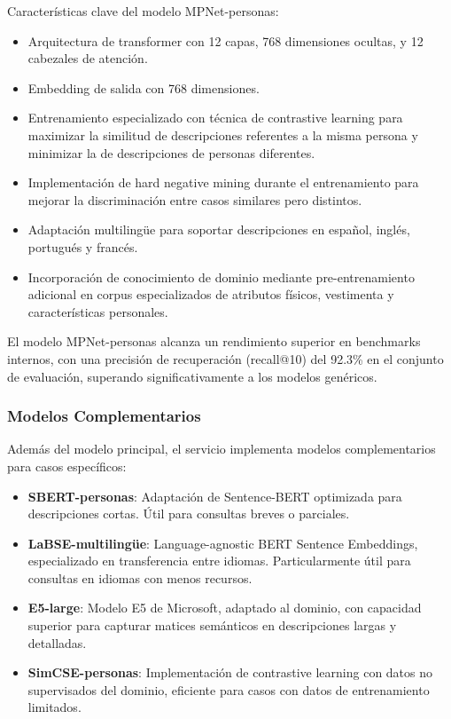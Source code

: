 \documentclass[12pt,a4paper]{article}
\begin{document}
Características clave del modelo MPNet-personas:
\begin{itemize}
    \item Arquitectura de transformer con 12 capas, 768 dimensiones ocultas, y 12 cabezales de atención.
    \item Embedding de salida con 768 dimensiones.
    \item Entrenamiento especializado con técnica de contrastive learning para maximizar la similitud de descripciones referentes a la misma persona y minimizar la de descripciones de personas diferentes.
    \item Implementación de hard negative mining durante el entrenamiento para mejorar la discriminación entre casos similares pero distintos.
    \item Adaptación multilingüe para soportar descripciones en español, inglés, portugués y francés.
    \item Incorporación de conocimiento de dominio mediante pre-entrenamiento adicional en corpus especializados de atributos físicos, vestimenta y características personales.
\end{itemize}

El modelo MPNet-personas alcanza un rendimiento superior en benchmarks internos, con una precisión de recuperación (recall@10) del 92.3\% en el conjunto de evaluación, superando significativamente a los modelos genéricos.

\subsubsection{Modelos Complementarios}
Además del modelo principal, el servicio implementa modelos complementarios para casos específicos:

\begin{itemize}
    \item \textbf{SBERT-personas}: Adaptación de Sentence-BERT optimizada para descripciones cortas. Útil para consultas breves o parciales.
    
    \item \textbf{LaBSE-multilingüe}: Language-agnostic BERT Sentence Embeddings, especializado en transferencia entre idiomas. Particularmente útil para consultas en idiomas con menos recursos.
    
    \item \textbf{E5-large}: Modelo E5 de Microsoft, adaptado al dominio, con capacidad superior para capturar matices semánticos en descripciones largas y detalladas.
    
    \item \textbf{SimCSE-personas}: Implementación de contrastive learning con datos no supervisados del dominio, eficiente para casos con datos de entrenamiento limitados.
\end{itemize}
\end{document}
